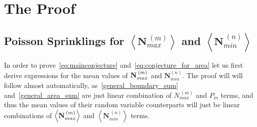\documentclass[12pt]{article}
\renewcommand{\P}[1]{P_{#1}}
\begin{document}

\section{The Proof}

\subsection{Poisson Sprinklings for $\left\langle \textbf{N}_{max}^{\: (m)}\right\rangle$ and $\left\langle \textbf{N}_{min}^{\: (n)}\right\rangle$}

In order to prove~\eqref{eq:mainconjecture} and~\eqref{eq:conjecture_for_area} let us first derive expressions for the mean values of $\textbf{N}_{\vphantom{i}max}^{\: (m)}$ and $\textbf{N}_{min}^{ (n)}$. The proof will will follow almost automatically, as~\eqref{general_boundary_sum} and~\eqref{general_area_sum} are just linear combination of $N_{max}^{\: (m)}$ and $\P{m}$ terms, and thus the mean values of their random variable counterparts will just be linear combinations of $\left\langle \textbf{N}_{\vphantom{i}max}^{\: (m)}\right\rangle$ and $\left\langle \textbf{N}_{min}^{\: (n)}\right\rangle$ terms.
\end{document}
